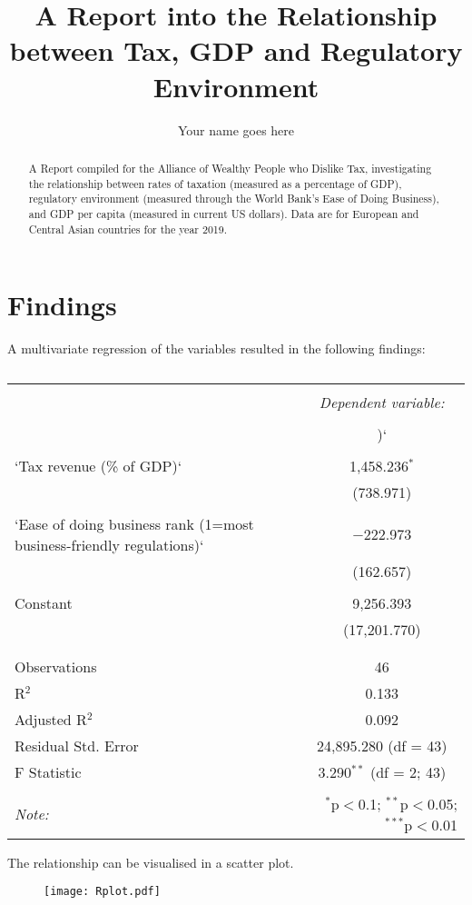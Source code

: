 \documentclass[]{report}
\title{A Report into the Relationship between Tax, GDP and Regulatory Environment}
\author{Your name goes here}
\begin{document}
\maketitle

\begin{abstract}
A Report compiled for the Alliance of Wealthy People who Dislike Tax, investigating the relationship between rates of taxation (measured as a percentage of GDP), regulatory environment (measured through the World Bank's Ease of Doing Business), and GDP per capita (measured in current US dollars). Data are for European and Central Asian countries for the year 2019.
\end{abstract}

\section{Findings}
A multivariate regression of the variables resulted in the following findings:

\begin{table}[!htbp] \centering 
	\caption{} 
	\label{} 
	\begin{tabular}{@{\extracolsep{5pt}}lc} 
		\\[-1.8ex]\hline 
		\hline \\[-1.8ex] 
		& \multicolumn{1}{c}{\textit{Dependent variable:}} \\ 
		\cline{2-2} 
		\\[-1.8ex] & )` \\ 
		\hline \\[-1.8ex] 
		`Tax revenue (\% of GDP)` & 1,458.236$^{*}$ \\ 
		& (738.971) \\ 
		& \\ 
		`Ease of doing business rank (1=most business-friendly regulations)` & $-$222.973 \\ 
		& (162.657) \\ 
		& \\ 
		Constant & 9,256.393 \\ 
		& (17,201.770) \\ 
		& \\ 
		\hline \\[-1.8ex] 
		Observations & 46 \\ 
		R$^{2}$ & 0.133 \\ 
		Adjusted R$^{2}$ & 0.092 \\ 
		Residual Std. Error & 24,895.280 (df = 43) \\ 
		F Statistic & 3.290$^{**}$ (df = 2; 43) \\ 
		\hline 
		\hline \\[-1.8ex] 
		\textit{Note:}  & \multicolumn{1}{r}{$^{*}$p$<$0.1; $^{**}$p$<$0.05; $^{***}$p$<$0.01} \\ 
	\end{tabular} 
\end{table} 

The relationship can be visualised in a scatter plot.

\begin{figure}[b!]\centering
	\texttt{[image: Rplot.pdf]}\\
\end{figure}
\end{document}
